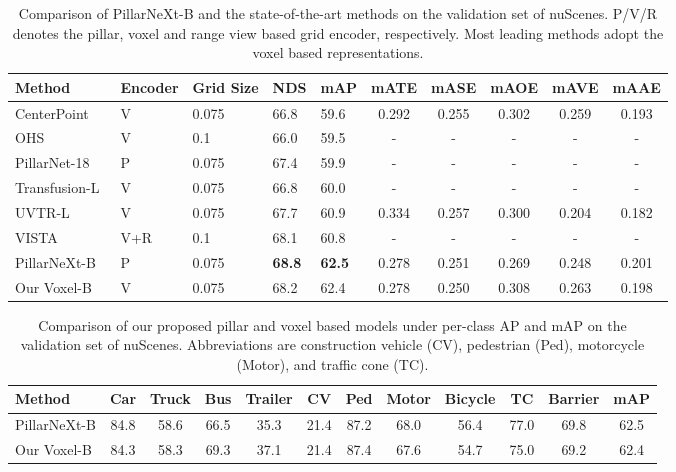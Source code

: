 \documentclass[10pt,twocolumn,letterpaper]{article}
\begin{document}
\begin{table*}[t]
\centering
\begin{tabular}{l|l|l|l|l|ccccc}
\hline
Method & Encoder & Grid Size & NDS & mAP & mATE & mASE & mAOE & mAVE & mAAE   \\ \hline
 CenterPoint~\cite{yin2021center}  & V &  0.075  &  66.8    &   59.6  &  0.292 & 0.255 & 0.302 & 0.259 & 0.193    \\
 OHS~\cite{chen2020object} & V & 0.1 & 66.0 & 59.5  &  -  &  -  &  -  &  -  &  - \\
PillarNet-18~\cite{shi2022pillarnet} & P    &  0.075     &    67.4 &    59.9 &  -  &  -  &  -  &  -  &  -    \\ 
Transfusion-L~\cite{bai2022transfusion} & V  &  0.075 & 66.8 & 60.0  &  -  &  -  &  -  &  -  &  -    \\ 
UVTR-L~\cite{li2022unifying} & V  &  0.075  & 67.7  & 60.9  & 0.334  & 0.257   &0.300   &0.204  & 0.182 \\  VISTA~\cite{deng2022vista} & V+R & 0.1 & 68.1 & 60.8  &  -  &  -  &  -  &  -  &  -    \\ 
PillarNeXt-B  & P  &  0.075     &    \textbf{68.8} &   \textbf{62.5}  &  0.278 & 0.251 & 0.269 & 0.248 & 0.201\\ 
Our Voxel-B& V  & 0.075 & 68.2 & 62.4 & 0.278 & 0.250 & 0.308 & 0.263 & 0.198 \\ \hline
\end{tabular}
\vspace{-2mm}
\caption{Comparison of PillarNeXt-B and the state-of-the-art methods on the validation set of nuScenes. P/V/R denotes the pillar, voxel and range view based grid encoder, respectively. Most leading methods adopt the voxel based representations.} 
\vspace{-1mm}
\label{exp:nusc}
\end{table*}

\begin{table*}[h!]
\centering
\begin{tabular}{l|cccccccccc|c}
\hline
Method & Car & Truck & Bus & Trailer & CV & Ped & Motor & Bicycle & TC & Barrier & mAP\\ \hline
PillarNeXt-B & 84.8 & 58.6 & 66.5 & 35.3 & 21.4 & 87.2 & 68.0 & 56.4 & 77.0 & 69.8  & 62.5\\ 
Our Voxel-B & 84.3 & 58.3 & 69.3 & 37.1 & 21.4 & 87.4 & 67.6 & 54.7 & 75.0 & 69.2 & 62.4\\ \hline
\end{tabular}
\vspace{-2mm}
\caption{Comparison of our proposed pillar and voxel based models under per-class AP and mAP on the validation set of nuScenes. Abbreviations are construction vehicle (CV), pedestrian (Ped), motorcycle (Motor), and traffic cone (TC).}
\label{tab:nusc_class}
\end{table*}
\end{document}
